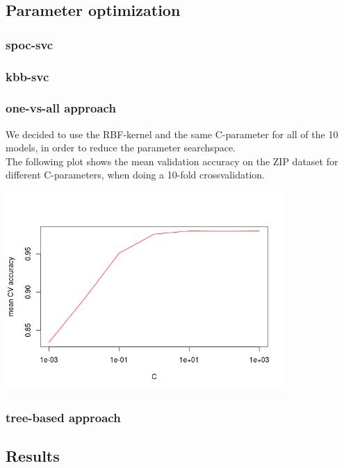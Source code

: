 \subsection{Parameter optimization}

\subsubsection{spoc-svc}

\subsubsection{kbb-svc}

\subsubsection{one-vs-all approach}

We decided to use the RBF-kernel and the same C-parameter for all of the 10 models,
in order to reduce the parameter searchspace.\\
The following plot shows the mean validation accuracy on the ZIP dataset
for different C-parameters, when doing a 10-fold crossvalidation.

\includegraphics[width=0.8\textwidth]{../plots/one_vs_all_zip}

\subsubsection{tree-based approach}


\subsection{Results}